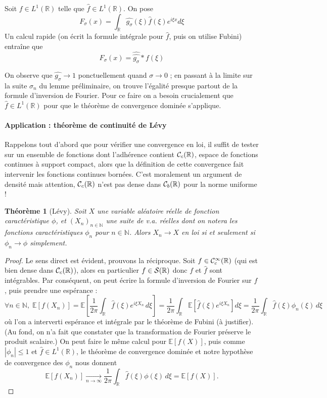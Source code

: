 \documentclass[a4paper, 11pt]{article}
\def\N{\mathbb{N}}
\def\R{\mathbb{R}}
\def\S{{\cal{S}}}
\def\Cf{{\cal{C}}}
\def\E{\mathbb{E}}
\newtheorem*{theorem}{Théorème}
\begin{document}
Soit $f \in L^1(\R)$ telle que $\hat{f} \in L^1(\R)$. On pose
\[ F_\sigma(x) = \int_\R \widehat{g_\sigma}(\xi)\hat{f}(\xi)e^{i\xi x} d\xi \]
Un calcul rapide (on écrit la formule intégrale pour $\hat{f}$, puis on utilise
Fubini) entraîne que
\[ F_\sigma(x) = \widehat{\widehat{g_\sigma}} * f(\xi) \]

On observe que $\widehat{g_\sigma} \longrightarrow 1$ ponctuellement quand
$\sigma \to 0$ ; en passant à la limite sur la suite $\sigma_n$ du lemme
préliminaire, on trouve l'égalité presque partout de la formule d'inversion de
Fourier. Pour ce faire on a besoin crucialement que $\hat{f} \in L^1(\R)$ pour
que le théorème de convergence dominée s'applique.

\paragraph{Application : théorème de continuité de Lévy} Rappelons tout d'abord
que pour vérifier une convergence en loi, il suffit de tester sur un ensemble de
fonctions dont l'adhérence contient $\Cf_c(\R)$, espace de fonctions continues
à support compact, alors que la définition de cette convergence fait intervenir
les fonctions continues bornées. C'est moralement un argument de densité mais
attention, $\Cf_c(\R)$ n'est pas dense dans $\Cf_b(\R)$ pour la norme uniforme !

\begin{theorem}[Lévy]
  Soit $X$ une variable aléatoire réelle de fonction caractéristique $\phi$, et
  $(X_n)_{n \in \N}$ une suite de v.a. réelles dont on notera les fonctions
  caractéristiques $\phi_n$ pour $n \in \N$. Alors $X_n \rightarrow X$ en loi si
  et seulement si $\phi_n \rightarrow \phi$ simplement.
\end{theorem}
\begin{proof}
  Le sens direct est évident, prouvons la réciproque. Soit $f \in
  \Cf^\infty_c(\R)$ (qui est bien dense dans $\Cf_c(\R)$), alors en particulier
  $f \in \S(\R)$ donc $f$ et $\hat{f}$ sont intégrables. Par conséquent, on peut
  écrire la formule d'inversion de Fourier sur $f$, puis prendre une espérance :
  \[ \forall n \in \N,\; \E[ f(X_n) ] = 
    \E\left[ \frac{1}{2\pi} \int_\R \hat{f}(\xi) e^{i\xi X_n}\,d\xi \right] =
    \frac{1}{2\pi} \int_\R \E\left[ \hat{f}(\xi) e^{i\xi X_n} \right] d\xi =
    \frac{1}{2\pi} \int_\R \hat{f}(\xi) \phi_n(\xi)\, d\xi
  \]
  où l'on a interverti espérance et intégrale par le théorème de Fubini (à
  justifier). (Au fond, on n'a fait que constater que la transformation de
  Fourier préserve le produit scalaire.) On peut faire le même calcul pour
  $\E[f(X)]$, puis comme $|\phi_n| \leq 1$ et $\hat{f} \in L^1(\R)$, le théorème
  de convergence dominée et notre  hypothèse de convergence des $\phi_n$ nous
  donnent
  \[ \E[ f(X_n) ] \underset{n \to \infty}{\longrightarrow}
    \frac{1}{2\pi} \int_\R \hat{f}(\xi) \phi(\xi)\, d\xi = \E[f(X)].  \]
\end{proof}
\end{document}
